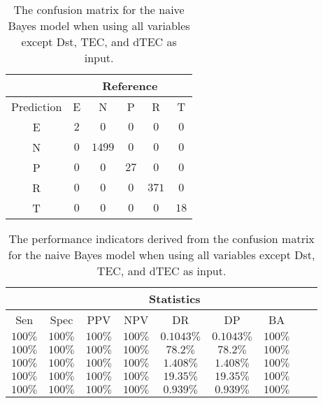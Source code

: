 \begin{table}[!ht]
	\centering
	\begin{tabular}{|c|c|c|c|c|c|}
		\hline
		 & \multicolumn{5}{|c|}{Reference} \\ \hline
		 Prediction & E & N & P & R & T \\ \hline
		 E & $2$ & $0$ & $0$ & $0$ & $0$ \\ \hline
		 N & $0$ & $1499$ & $0$ & $0$ & $0$ \\ \hline
		 P & $0$ & $0$ & $27$ & $0$ & $0$ \\ \hline
		 R & $0$ & $0$ & $0$ & $371$ & $0$ \\ \hline
		 T & $0$ & $0$ & $0$ & $0$ & $18$ \\ \hline
	\end{tabular}
	\caption{The confusion matrix for the naive Bayes model when using all variables except Dst, TEC, and dTEC as input.}
	\label{tab:cm:noTEC:nb}
\end{table}

\begin{table}[!ht]
	\centering
	\begin{tabular}{|c|c|c|c|c|c|c|c|c|}
		\hline
		 & \multicolumn{7}{c|}{Statistics} \\ \hline
		Sen & Spec & PPV & NPV & DR & DP & BA \\ \hline
		$100\%$ & $100\%$ & $100\%$ & $100\%$ & $0.1043\%$ & $0.1043\%$ & $100\%$ \\ \hline
		$100\%$ & $100\%$ & $100\%$ & $100\%$ & $78.2\%$ & $78.2\%$ & $100\%$ \\ \hline
		$100\%$ & $100\%$ & $100\%$ & $100\%$ & $1.408\%$ & $1.408\%$ & $100\%$ \\ \hline
		$100\%$ & $100\%$ & $100\%$ & $100\%$ & $19.35\%$ & $19.35\%$ & $100\%$ \\ \hline
		$100\%$ & $100\%$ & $100\%$ & $100\%$ & $0.939\%$ & $0.939\%$ & $100\%$ \\ \hline
	\end{tabular}
	\caption{The performance indicators derived from the confusion matrix for the naive Bayes model when using all variables except Dst, TEC, and dTEC as input.}
	\label{tab:cs:noTEC:nb}
\end{table}

